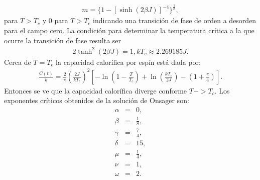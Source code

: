\documentclass[letterpaper,12pt,oneside]{book}
\begin{document}
%
\begin{eqnarray}
m=\{1-[\sinh(2 \beta J)]^{-4}\}^{\frac{1}{8}},
\end{eqnarray}
%
para $T>T_c$ y 0 para $T>T_c$ indicando una transici\'on de fase de orden a desorden para el campo cero. La condici\'on para determinar la temperatura cr\'itica a la que ocurre la transici\'on de fase  resulta ser
%
\begin{eqnarray}
2\tanh^2(2\beta J)=1,
kT_c \approx 2.269185 J.
\end{eqnarray}
%
Cerca de $T = T_c$ la capacidad calor\'ifica por esp\'in est\'a dada por:
%
\begin{eqnarray}
\frac{C(t)}{k} = \frac{2}{\pi} \left(\frac{2J}{kT_c}\right)^2\left[-\ln\left(1-\frac{T}{T_c}\right)+\ln\left(\frac{kT_c}{2J}\right)-\left(1+\frac{\pi}{4}\right)\right].
\end{eqnarray}
%
Entonces se ve que la capacidad calor\'ifica diverge conforme $T->T_c$.
Los exponentes cr\'iticos obtenidos de la soluci\'on de Onsager \cite{Onsager} son:
%
\begin{eqnarray}
\alpha &=& 0,\\
\beta &=& \frac{1}{8},\\
\gamma &=& \frac{7}{4},\\
\delta &=& 15,\\
\mu &=& \frac{1}{4},\\
\nu &=& 1,\\
\omega &=& 2.
\end{eqnarray}
%
\end{document}
